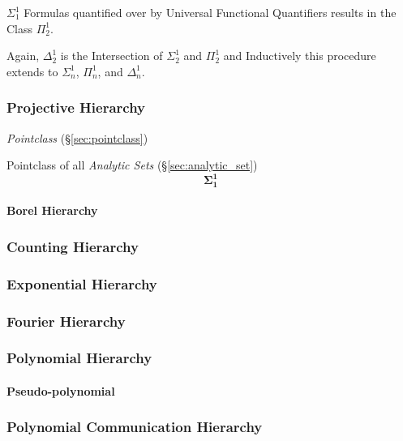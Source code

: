 $\Sigma^1_1$ Formulas quantified over by Universal Functional
Quantifiers results in the Class $\Pi^1_2$.

Again, $\Delta^1_2$ is the Intersection of $\Sigma^1_2$ and $\Pi^1_2$
and Inductively this procedure extends to $\Sigma^1_n$, $\Pi^1_n$, and
$\Delta^1_n$.



\subsubsection{Projective Hierarchy}\label{sec:projective_hierarchy}

\emph{Pointclass} (\S\ref{sec:pointclass})

Pointclass of all \emph{Analytic Sets} (\S\ref{sec:analytic_set})
\[
  \mathbf{\Sigma^1_1}
\]

\paragraph{Borel Hierarchy}\hfill



\subsubsection{Counting Hierarchy}

\subsubsection{Exponential Hierarchy}

\subsubsection{Fourier Hierarchy}

\subsubsection{Polynomial Hierarchy}

\paragraph{Pseudo-polynomial}\label{sec:pseudo_polynomial}\hfill

\subsubsection{Polynomial Communication Hierarchy}

